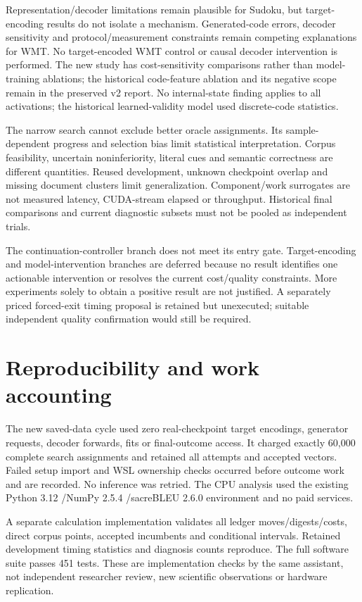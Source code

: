 \documentclass[11pt]{article}
\begin{document}
Representation/decoder limitations remain plausible for Sudoku, but target-encoding results do not isolate a mechanism. Generated-code errors, decoder sensitivity and protocol/measurement constraints remain competing explanations for WMT. No target-encoded WMT control or causal decoder intervention is performed. The new study has cost-sensitivity comparisons rather than model-training ablations; the historical code-feature ablation and its negative scope remain in the preserved v2 report. No internal-state finding applies to all activations; the historical learned-validity model used discrete-code statistics.

The narrow search cannot exclude better oracle assignments. Its sample-dependent progress and selection bias limit statistical interpretation. Corpus feasibility, uncertain noninferiority, literal cues and semantic correctness are different quantities. Reused development, unknown checkpoint overlap and missing document clusters limit generalization. Component/work surrogates are not measured latency, CUDA-stream elapsed or throughput. Historical final comparisons and current diagnostic subsets must not be pooled as independent trials.

The continuation-controller branch does not meet its entry gate. Target-encoding and model-intervention branches are deferred because no result identifies one actionable intervention or resolves the current cost/quality constraints. More experiments solely to obtain a positive result are not justified. A separately priced forced-exit timing proposal is retained but unexecuted; suitable independent quality confirmation would still be required.

\section{Reproducibility and work accounting}
The new saved-data cycle used zero real-checkpoint target encodings, generator requests, decoder forwards, fits or final-outcome access. It charged exactly 60,000 complete search assignments and retained all attempts and accepted vectors. Failed setup import and WSL ownership checks occurred before outcome work and are recorded. No inference was retried. The CPU analysis used the existing Python 3.12 /NumPy 2.5.4 /sacreBLEU 2.6.0 environment and no paid services.

A separate calculation implementation validates all ledger moves/digests/costs, direct corpus points, accepted incumbents and conditional intervals. Retained development timing statistics and diagnosis counts reproduce. The full software suite passes 451 tests. These are implementation checks by the same assistant, not independent researcher review, new scientific observations or hardware replication.
\end{document}
